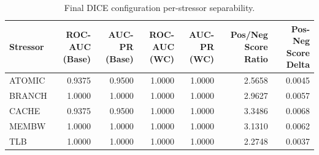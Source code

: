 \begin{table}[t]
\centering
\caption{Final DICE configuration per-stressor separability.}
\label{tab:dice_full_stressor}
\footnotesize
\begin{tabular}{lrrrrrr}
\toprule
Stressor & ROC-AUC (Base) & AUC-PR (Base) & ROC-AUC (WC) & AUC-PR (WC) & Pos/Neg Score Ratio & Pos-Neg Score Delta \\
\midrule
ATOMIC & 0.9375 & 0.9500 & 1.0000 & 1.0000 & 2.5658 & 0.0045 \\
BRANCH & 1.0000 & 1.0000 & 1.0000 & 1.0000 & 2.9627 & 0.0057 \\
CACHE & 0.9375 & 0.9500 & 1.0000 & 1.0000 & 3.3486 & 0.0068 \\
MEMBW & 1.0000 & 1.0000 & 1.0000 & 1.0000 & 3.1310 & 0.0062 \\
TLB & 1.0000 & 1.0000 & 1.0000 & 1.0000 & 2.2748 & 0.0037 \\
\bottomrule
\end{tabular}

\end{table}
